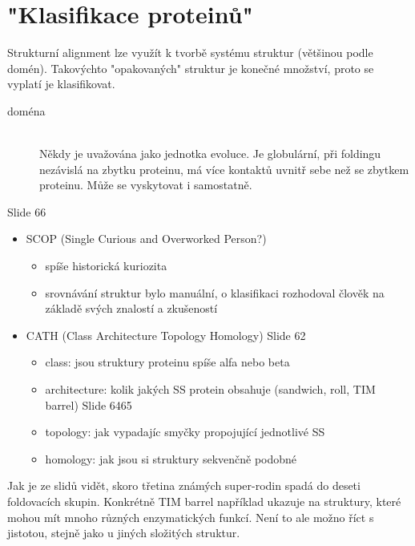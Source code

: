 \documentclass[DIV=8]{scrreprt}
\begin{document}
\section{"Klasifikace proteinů"}

Strukturní alignment lze využít k tvorbě systému struktur (většinou podle domén). Takovýchto "opakovaných" struktur je konečné množství, proto se vyplatí je klasifikovat.

\begin{description}
\item[doména]\hfill \\
Někdy je uvažována jako jednotka evoluce. Je globulární, při foldingu nezávislá na zbytku proteinu, má více kontaktů uvnitř sebe než se zbytkem proteinu. Může se vyskytovat i samostatně.

\end{description}


Slide 66
\begin{itemize}
    \item SCOP (Single Curious and Overworked Person?)
\begin{itemize}
    \item spíše historická kuriozita
    \item srovnávání struktur bylo manuální, o klasifikaci rozhodoval člověk na základě svých znalostí a zkušeností
\end{itemize}

    \item CATH (Class Architecture Topology Homology) Slide 62
\begin{itemize}
    \item class: jsou struktury proteinu spíše alfa nebo beta
    \item architecture: kolik jakých SS protein obsahuje (sandwich, roll, TIM barrel) Slide 6465
    \item topology: jak vypadajíc smyčky propojující jednotlivé SS
    \item homology: jak jsou si struktury sekvenčně podobné
\end{itemize}

\end{itemize}


Jak je ze slidů vidět, skoro třetina známých super-rodin spadá do deseti foldovacích skupin. Konkrétně TIM barrel například ukazuje na struktury, které mohou mít mnoho různých enzymatických funkcí. Není to ale možno říct s jistotou, stejně jako u jiných složitých struktur.
\end{document}
